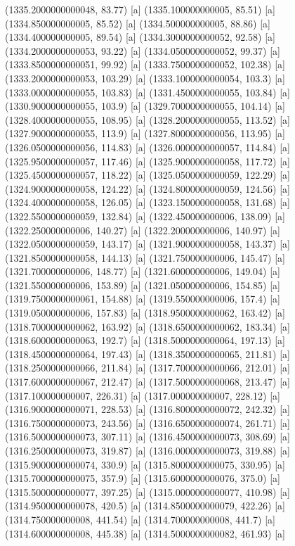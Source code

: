 {{{(1335.2000000000048, 83.77) [a] 
(1335.100000000005, 85.51) [a] 
(1334.850000000005, 85.52) [a] 
(1334.500000000005, 88.86) [a] 
(1334.400000000005, 89.54) [a] 
(1334.3000000000052, 92.58) [a] 
(1334.2000000000053, 93.22) [a] 
(1334.0500000000052, 99.37) [a] 
(1333.8500000000051, 99.92) [a] 
(1333.7500000000052, 102.38) [a] 
(1333.2000000000053, 103.29) [a] 
(1333.1000000000054, 103.3) [a] 
(1333.0000000000055, 103.83) [a] 
(1331.4500000000055, 103.84) [a] 
(1330.9000000000055, 103.9) [a] 
(1329.7000000000055, 104.14) [a] 
(1328.4000000000055, 108.95) [a] 
(1328.2000000000055, 113.52) [a] 
(1327.9000000000055, 113.9) [a] 
(1327.8000000000056, 113.95) [a] 
(1326.0500000000056, 114.83) [a] 
(1326.0000000000057, 114.84) [a] 
(1325.9500000000057, 117.46) [a] 
(1325.9000000000058, 117.72) [a] 
(1325.4500000000057, 118.22) [a] 
(1325.0500000000059, 122.29) [a] 
(1324.9000000000058, 124.22) [a] 
(1324.8000000000059, 124.56) [a] 
(1324.4000000000058, 126.05) [a] 
(1323.1500000000058, 131.68) [a] 
(1322.5500000000059, 132.84) [a] 
(1322.450000000006, 138.09) [a] 
(1322.250000000006, 140.27) [a] 
(1322.200000000006, 140.97) [a] 
(1322.0500000000059, 143.17) [a] 
(1321.9000000000058, 143.37) [a] 
(1321.8500000000058, 144.13) [a] 
(1321.750000000006, 145.47) [a] 
(1321.700000000006, 148.77) [a] 
(1321.600000000006, 149.04) [a] 
(1321.550000000006, 153.89) [a] 
(1321.050000000006, 154.85) [a] 
(1319.7500000000061, 154.88) [a] 
(1319.550000000006, 157.4) [a] 
(1319.050000000006, 157.83) [a] 
(1318.9500000000062, 163.42) [a] 
(1318.7000000000062, 163.92) [a] 
(1318.6500000000062, 183.34) [a] 
(1318.6000000000063, 192.7) [a] 
(1318.5000000000064, 197.13) [a] 
(1318.4500000000064, 197.43) [a] 
(1318.3500000000065, 211.81) [a] 
(1318.2500000000066, 211.84) [a] 
(1317.7000000000066, 212.01) [a] 
(1317.6000000000067, 212.47) [a] 
(1317.5000000000068, 213.47) [a] 
(1317.100000000007, 226.31) [a] 
(1317.000000000007, 228.12) [a] 
(1316.9000000000071, 228.53) [a] 
(1316.8000000000072, 242.32) [a] 
(1316.7500000000073, 243.56) [a] 
(1316.6500000000074, 261.71) [a] 
(1316.5000000000073, 307.11) [a] 
(1316.4500000000073, 308.69) [a] 
(1316.2500000000073, 319.87) [a] 
(1316.0000000000073, 319.88) [a] 
(1315.9000000000074, 330.9) [a] 
(1315.8000000000075, 330.95) [a] 
(1315.7000000000075, 357.9) [a] 
(1315.6000000000076, 375.0) [a] 
(1315.5000000000077, 397.25) [a] 
(1315.0000000000077, 410.98) [a] 
(1314.9500000000078, 420.5) [a] 
(1314.8500000000079, 422.26) [a] 
(1314.750000000008, 441.54) [a] 
(1314.700000000008, 441.7) [a] 
(1314.600000000008, 445.38) [a] 
(1314.5000000000082, 461.93) [a] 
}}}
